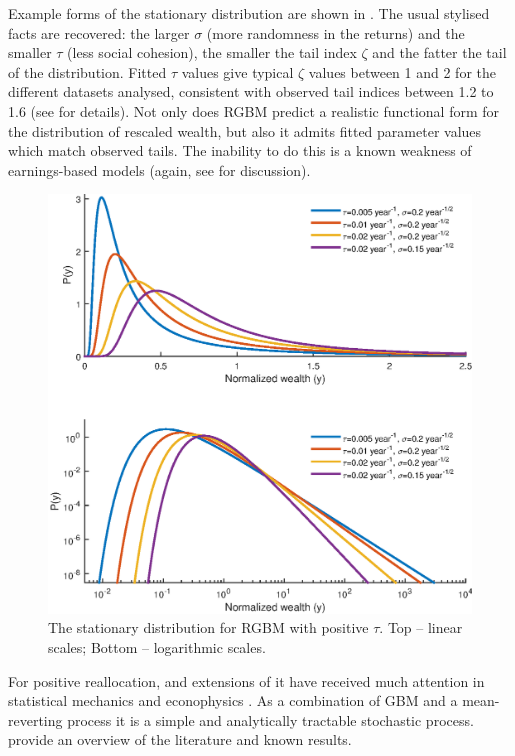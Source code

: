 Example forms of the stationary distribution are shown in . The usual stylised facts are recovered: the larger $\sigma$ (more randomness in the returns) and the smaller $\tau$ (less social cohesion), the smaller the tail index $\zeta$ and the fatter the tail of the distribution. Fitted $\tau$ values give typical $\zeta$ values between 1 and 2 for the different datasets analysed, consistent with observed tail indices between 1.2 to 1.6 (see \cite{BermanPetersAdamou2017} for details). Not only does RGBM predict a realistic functional form for the distribution of rescaled wealth, but also it admits fitted parameter values which match observed tails. The inability to do this is a known weakness of earnings-based models (again, see \cite{BermanPetersAdamou2017} for discussion).

\begin{figure}[!htb]
\centering
\includegraphics[width=1.0\textwidth] {./chapter_3/figs/dists.eps}
\caption{The stationary distribution for RGBM with positive $\tau$. Top -- linear scales; Bottom -- logarithmic scales.}
\end{figure}

For positive reallocation,  and extensions of it have received much attention in statistical mechanics and econophysics \cite{BouchaudMezard2000,Bouchaud2015}. As a combination of GBM and a mean-reverting process it is a simple and analytically tractable stochastic process. \cite{LiuSerota2016} provide an overview of the literature and known results.


